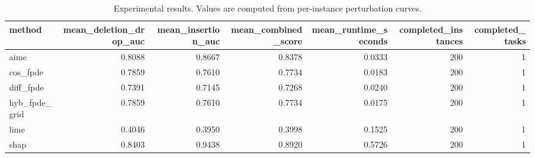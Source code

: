\begin{table}[t]
\caption{Experimental results. Values are computed from per-instance perturbation curves.}
\label{tab:main_results_computed}
\centering
\begin{tabular}{lrrrrrr}
\toprule
method & mean\_deletion\_drop\_auc & mean\_insertion\_auc & mean\_combined\_score & mean\_runtime\_seconds & completed\_instances & completed\_tasks \\
\midrule
aime & 0.8088 & 0.8667 & 0.8378 & 0.0333 & 200 & 1 \\
cos\_fpde & 0.7859 & 0.7610 & 0.7734 & 0.0183 & 200 & 1 \\
diff\_fpde & 0.7391 & 0.7145 & 0.7268 & 0.0240 & 200 & 1 \\
hyb\_fpde\_grid & 0.7859 & 0.7610 & 0.7734 & 0.0175 & 200 & 1 \\
lime & 0.4046 & 0.3950 & 0.3998 & 0.1525 & 200 & 1 \\
shap & 0.8403 & 0.9438 & 0.8920 & 0.5726 & 200 & 1 \\
\bottomrule
\end{tabular}

\end{table}
